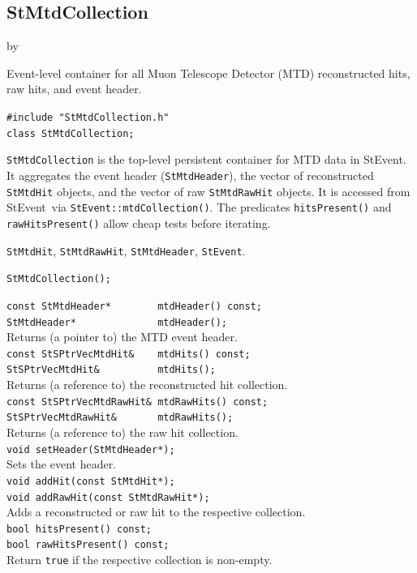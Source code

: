 \documentclass[twoside]{article}
\newcommand{\StEvent}{\textsf{StEvent}}
\newcommand{\entrylabel}[1]{\mbox{\textbf{{#1}}}\hfil}%
\newenvironment{entry}
{\begin{list}{}%
    {\renewcommand{\makelabel}{\entrylabel}%
     \setlength{\labelwidth}{90pt}%
     \setlength{\leftmargin}{\labelwidth}
     \advance\leftmargin by \labelsep%
      }%
    }%
  {\end{list}}
\newcommand{\Entrylabel}[1]%
{\raisebox{0pt}[1ex][0pt]{\makebox[\labelwidth][l]%
    {\parbox[t]{\labelwidth}{\hspace{0pt}\textbf{{#1}}}}}}
\newenvironment{Entry}%
{\renewcommand{\entrylabel}{\Entrylabel}\begin{entry}}%
  {\end{entry}}
\begin{document}
\subsection{StMtdCollection}
\label{sec:StMtdCollection}
\begin{Entry}
\item[Summary] Event-level container for all Muon Telescope Detector (MTD)
    reconstructed hits, raw hits, and event header.
\item[Synopsis]
    \verb+#include "StMtdCollection.h"+\\
    \verb+class StMtdCollection;+\\
\item[Description]
    \texttt{StMtdCollection} is the top-level persistent container for MTD
    data in \StEvent.  It aggregates the event header
    (\texttt{StMtdHeader}), the vector of reconstructed \texttt{StMtdHit}
    objects, and the vector of raw \texttt{StMtdRawHit} objects.  It is
    accessed from \StEvent\ via \verb+StEvent::mtdCollection()+.  The
    predicates \verb+hitsPresent()+ and \verb+rawHitsPresent()+ allow cheap
    tests before iterating.
\item[Related Classes]
    \texttt{StMtdHit}, \texttt{StMtdRawHit}, \texttt{StMtdHeader},
    \texttt{StEvent}.
\item[Public\\ Constructors]
    \verb+StMtdCollection();+\\
\item[Public Member\\ Functions]
    \verb+const StMtdHeader*        mtdHeader() const;+\\
    \verb+StMtdHeader*              mtdHeader();+\\
    Returns (a pointer to) the MTD event header.\\
    \verb+const StSPtrVecMtdHit&    mtdHits() const;+\\
    \verb+StSPtrVecMtdHit&          mtdHits();+\\
    Returns (a reference to) the reconstructed hit collection.\\
    \verb+const StSPtrVecMtdRawHit& mtdRawHits() const;+\\
    \verb+StSPtrVecMtdRawHit&       mtdRawHits();+\\
    Returns (a reference to) the raw hit collection.\\
    \verb+void setHeader(StMtdHeader*);+\\
    Sets the event header.\\
    \verb+void addHit(const StMtdHit*);+\\
    \verb+void addRawHit(const StMtdRawHit*);+\\
    Adds a reconstructed or raw hit to the respective collection.\\
    \verb+bool hitsPresent() const;+\\
    \verb+bool rawHitsPresent() const;+\\
    Return \verb+true+ if the respective collection is non-empty.\\
\end{Entry}
\clearpage
\end{document}
